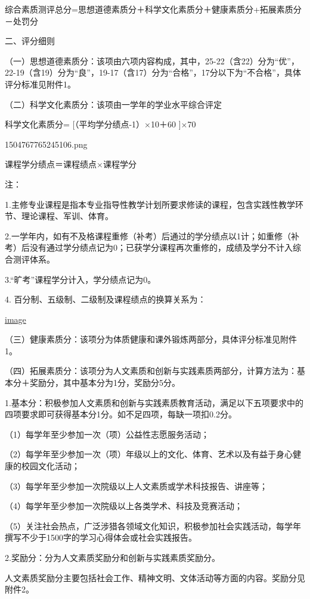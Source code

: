 \documentclass[UTF8,12pt,a4paper]{report}
\begin{document}
综合素质测评总分=思想道德素质分＋科学文化素质分＋健康素质分+拓展素质分－处罚分

二、评分细则

（一）思想道德素质分：该项由六项内容构成，其中，25-22（含22）分为“优”，22-19（含19）分为“良”，19-17（含17）分为“合格”，17分以下为“不合格”，具体评分标准见附件1。

（二）科学文化素质分：该项由一学年的学业水平综合评定

科学文化素质分= [（平均学分绩点-1）$\times$10＋60 ]$\times$70%

1504767765245106.png

课程学分绩点＝课程绩点$\times$课程学分

注：

1.主修专业课程是指本专业指导性教学计划所要求修读的课程，包含实践性教学环节、理论课程、军训、体育。

2.一学年内，如有不及格课程重修（补考）后通过的学分绩点以1计；如重修（补考）后没有通过学分绩点记为0；已获学分课程再次重修的，成绩及学分不计入综合测评体系。

3.“旷考”课程学分计入，学分绩点记为0。

4. 百分制、五级制、二级制及课程绩点的换算关系为：

\href{http://img01.fs.yiban.cn/out/thumb_550x0/aHR0cDovL3lmczAxLmZzLnlpYmFuLmNuL3dlYi83NTg4OTE0L3VwbG9hZC8xNTA0NzY5Mjc4NTE2NTc3LnBuZw==}{image}

（三）健康素质分：该项分为体质健康和课外锻炼两部分，具体评分标准见附件1。

（四）拓展素质分：该项分为人文素质和创新与实践素质两部分，计算方法为：基本分＋奖励分，其中基本分为1分，奖励分5分。

1.基本分：积极参加人文素质和创新与实践素质教育活动，满足以下五项要求中的四项要求即可获得基本分1分。如不足四项，每缺一项扣0.2分。

（1）每学年至少参加一次（项）公益性志愿服务活动；

（2）每学年至少参加一次（项）年级以上的文化、体育、艺术以及有益于身心健康的校园文化活动；

（3）每学年至少参加一次院级以上人文素质或学术科技报告、讲座等；

（4）每学年至少参加一次院级以上各类学术、科技及竞赛活动；

（5）关注社会热点，广泛涉猎各领域文化知识，积极参加社会实践活动，每学年撰写不少于1500字的学习心得体会或社会实践报告。

2.奖励分：分为人文素质奖励分和创新与实践素质奖励分。

人文素质奖励分主要包括社会工作、精神文明、文体活动等方面的内容。奖励分见附件2。
\end{document}
